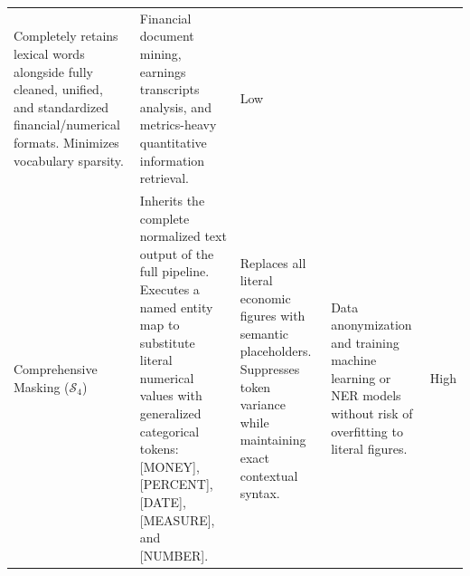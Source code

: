 \documentclass[manuscript,screen,review, nonacm]{acmart}
\begin{document}
\begin{table}[t]
\begin{tabularx}{\textwidth}{l >{\hsize=1.4\hsize}X >{\hsize=0.8\hsize}X >{\hsize=0.8\hsize}X l}
        Completely retains lexical words alongside fully cleaned, unified, and standardized financial/numerical formats. Minimizes vocabulary sparsity. &
        Financial document mining, earnings transcripts analysis, and metrics-heavy quantitative information retrieval. &
        Low \\
        \addlinespace
        Comprehensive \newline Masking ($\mathcal{S}_4$) &
        Inherits the complete normalized text output of the full pipeline. Executes a named entity map to substitute literal numerical values with generalized categorical tokens: [MONEY], [PERCENT], [DATE], [MEASURE], and [NUMBER]. &
        Replaces all literal economic figures with semantic placeholders. Suppresses token variance while maintaining exact contextual syntax. &
        Data anonymization and training machine learning or NER models without risk of overfitting to literal figures. &
        High \\
        \bottomrule
    \end{tabularx}
\end{table}
\end{document}
